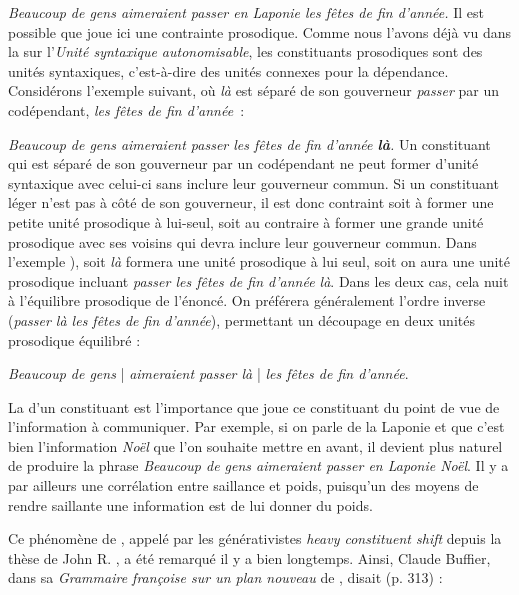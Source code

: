 \ea
    {\itshape Beaucoup de gens aimeraient passer en Laponie les fêtes de fin d’année.}
\z
Il est possible que joue ici une contrainte prosodique. Comme nous l’avons déjà vu dans la  sur l’\textit{Unité syntaxique autonomisable}, les constituants prosodiques sont des unités syntaxiques, c’est-à-dire des unités connexes pour la dépendance. Considérons l’exemple suivant, où \textit{là} est séparé de son gouverneur \textit{passer} par un codépendant, \textit{les fêtes de fin d’année~}:

\ea\label{ex:fetes}
{\itshape Beaucoup de gens aimeraient passer les fêtes de fin d’année \textbf{{là}}.}
\z
Un constituant qui est séparé de son gouverneur par un codépendant ne peut former d’unité syntaxique avec celui-ci sans inclure leur gouverneur commun. Si un constituant léger n’est pas à côté de son gouverneur, il est donc contraint soit à former une petite unité prosodique à lui-seul, soit au contraire à former une grande unité prosodique avec ses voisins qui devra inclure leur gouverneur commun. Dans l'exemple ), soit \textit{là} formera une unité prosodique à lui seul, soit on aura une unité prosodique incluant \textit{passer les fêtes de fin d'année là}. Dans les deux cas, cela nuit à l’équilibre prosodique de l’énoncé. On préférera généralement l’ordre inverse (\textit{passer là les fêtes de fin d’année}), permettant un découpage en deux unités prosodique équilibré :

\ea
\textit{Beaucoup de gens} | \textit{aimeraient passer là} | \textit{les fêtes de fin d’année}.
\z

La  d’un constituant est l’importance que joue ce constituant du point de vue de l’information à communiquer. Par exemple, si on parle de la Laponie et que c’est bien l’information \textit{Noël} que l’on souhaite mettre en avant, il devient plus naturel de produire la phrase \textit{Beaucoup de gens aimeraient passer en Laponie Noël}. Il y a par ailleurs une corrélation entre saillance et poids, puisqu’un des moyens de rendre saillante une information est de lui donner du poids.

Ce phénomène de , appelé par les générativistes \textit{heavy constituent shift} depuis la thèse de John R. \citet{ross1967constraints}, a été remarqué il y a bien longtemps. Ainsi, Claude Buffier, dans sa \textit{Grammaire françoise sur un plan nouveau} de \citeyear{buffier1709grammaire}, disait (p. 313) :

